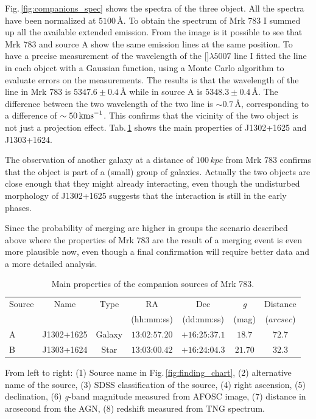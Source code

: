 \documentclass[../main.tex]{subfiles}
\begin{document}
Fig.\,\ref{fig:companions_spec} shows the spectra of the three object.
All the spectra have been normalized at $5100\,\si{\angstrom}$.
To obtain the spectrum of Mrk 783 I summed up all the available extended emission.
From the image is it possible to see that Mrk 783 and source A show the same emission lines at the same position. 
To have a precise measurement of the wavelength of the []$\lambda5007$ line I fitted the line in each object with a Gaussian function, using a Monte Carlo algorithm to evaluate errors on the measurements.
The results is that the wavelength of the line in Mrk 783  is $5347.6\pm0.4\,\si{\angstrom}$ while in source A is $5348.3\pm0.4\,\si{\angstrom}$.
The difference between the two wavelength of the two line is $\sim 0.7\,\si{\angstrom}$, corresponding to a difference of $\sim 50\,\si{\kms}$.
This confirms that the vicinity of the two object is not just a projection effect.
Tab.\,\ref{tab:companions} shows the main properties of J1302+1625 and J1303+1624.

The observation of another galaxy at a distance of $100\,\si{kpc}$ from Mrk 783 confirms that the object is part of a (small) group of galaxies.
Actually the two objects are close enough that they might already interacting, even though the undisturbed morphology of J1302+1625 suggests that the interaction is still in the early phases.

Since the probability of merging are higher in groups \citep{Kampczyk13} the scenario described above where the properties of Mrk 783 are the result of a merging event is even more plausible now, even though a final confirmation will require better data and a more detailed analysis.

\begin{table}
    \centering
    \caption{Main properties of the companion sources of Mrk 783.}
    \label{tab:companions}
    \begin{threeparttable}
    \begin{tabular}{lcccccc}
    \hline
    \hline
    Source& Name & Type& RA & Dec & \emph{g}& Distance\\
          &      &     & (hh:mm:ss)&(dd:mm:ss)& (mag) &($\si{arcsec}$)\\
    \hline
    A &J1302+1625&Galaxy &$13$:$02$:$57.20$&$+16$:$25$:$37.1$&$18.7$&$72.7$\\
    B &J1303+1624&Star &$13$:$03$:$00.42$&$+16$:$24$:$04.3$&$21.70$&$32.3$\\
    \hline
    \end{tabular}
    \begin{tablenotes}
    \item From left to right: (1) Source name in Fig.\,\ref{fig:finding_chart}, (2) alternative name of the source, (3) SDSS classification of the source, (4) right ascension, (5) declination, (6) \emph{g}-band magnitude measured from AFOSC image, (7) distance in arcsecond from the AGN, (8) redshift measured from TNG spectrum.
    \end{tablenotes}
    \end{threeparttable}
\end{table}
\end{document}
